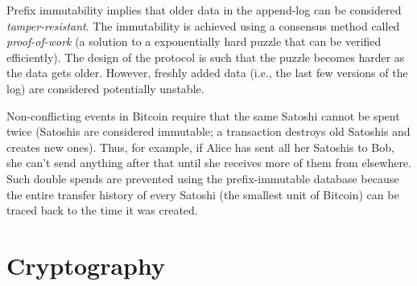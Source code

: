 \documentclass[]{report}   %
\newcommand{\authnote}[2]{\marginpar{\parbox{\marginparwidth}{\tiny %
  \textsf{#1 {\textcolor{blue}{notes: #2}}}}}%
  \textcolor{blue}{\textbf{\dag}}}
\newcommand{\authnote}[2]{
  \textsf{#1 \textcolor{blue}{: #2}}}
\newcommand{\authnote}[2]{}
\newcommand{\anote}[1]{{\authnote{\textcolor{red}{asc9 notes}}{#1}}}
\begin{document}
Prefix immutability implies that older data in the append-log can be considered {\em tamper-resistant}. The immutability is achieved using a consensus method called {\em proof-of-work} (a solution to a exponentially hard puzzle that can be verified efficiently). The design of the protocol is such that the puzzle becomes harder as the data gets older. However, freshly added data (i.e., the last few versions of the log) are considered potentially unstable. 

Non-conflicting events in Bitcoin require that the same Satoshi cannot be spent twice (Satoshis are considered immutable; a transaction destroys old Satoshis and creates new ones). Thus, for example, if Alice has sent all her Satoshis to Bob, she can't send anything after that until she receives more of them from elsewhere.
Such double spends are prevented using the prefix-immutable database because the entire transfer history of every Satoshi (the smallest unit of Bitcoin) can be traced back to the time it was created. 


%
%

\section{Cryptography}

\anote{will be improving this section as per Mario's comments}
\end{document}
